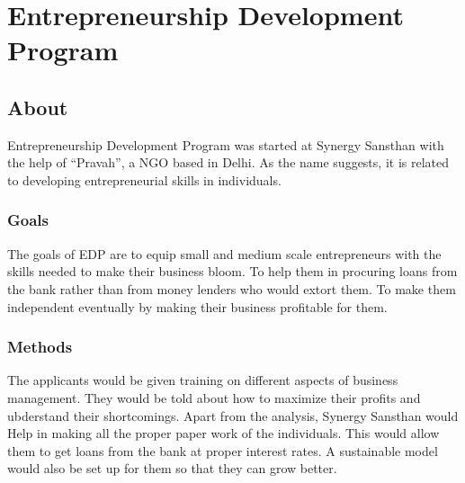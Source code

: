 \chapter{Entrepreneurship Development Program}
\ifpdf
    \graphicspath{{Chapter3/Chapter3Figs/PNG/}{Chapter3/Chapter3Figs/PDF/}{Chapter3/Chapter3Figs/}}
\else
    \graphicspath{{Chapter3/Chapter3Figs/EPS/}{Chapter3/Chapter3Figs/}}
\fi

\section{About}
Entrepreneurship Development Program was started at Synergy Sansthan with the help of ``Pravah'', a NGO based in Delhi. As the name suggests, it is related to developing entrepreneurial skills in individuals. 

\subsection{Goals}
The goals of EDP are to equip small and medium scale entrepreneurs with the skills needed to make their business bloom. To help them in procuring loans from the bank rather than from money lenders who would extort them. To make them independent eventually by making their business profitable for them.

\subsection{Methods}
The applicants would be given training on different aspects of business management. They would be told about how to maximize their profits and ubderstand their shortcomings. Apart from the analysis, Synergy Sansthan would Help in making all the proper paper work of the individuals. This would allow them to get loans from the bank at proper interest rates. A sustainable model would also be set up for them so that they can grow better.


